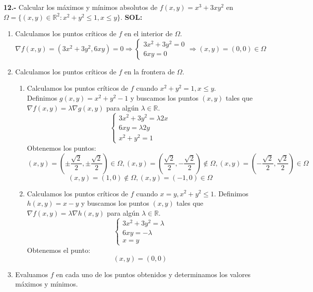 \documentclass[10pt,a4paper]{article}
\begin{document}
\textbf{12.-} Calcular los máximos y mínimos absolutos de $f(x,y)=x^3+3xy^2$ en $\Omega=\{(x,y)\in \mathbb R^2:x^2+y^2\leq 1, x\leq y\}$.
\textbf{SOL:}\\
\begin{enumerate}[1.]
\item Calculamos los puntos críticos de $f$ en el interior de $\Omega$.
$$\nabla f(x,y)=(3x^2+3y^2, 6xy)=0 \Rightarrow \begin{cases} 3x^2+3y^2=0\\6xy=0\end{cases}\Rightarrow (x,y)=(0,0)\in \Omega$$
\item Calculamos los puntos críticos de $f$ en la frontera de $\Omega$.\\
\begin{enumerate}[2.1.]
\item Calculamos los puntos críticos de $f$ cuando $x^2+y^2=1, x\leq y$.\\
Definimos $g(x,y)=x^2+y^2-1$ y buscamos los puntos $(x,y)$ tales que $\nabla f(x,y)=\lambda \nabla g(x,y)$ para algún $\lambda \in \mathbb R$.
$$\begin{cases}
3x^2+3y^2=\lambda 2x\\ 6xy=\lambda 2y\\ x^2+y^2=1
\end{cases}$$
Obtenemos los puntos:
$$(x,y)=\left(\pm\dfrac{\sqrt{2}}{2},\pm\dfrac{\sqrt{2}}{2}\right)\in \Omega,
(x,y)=\left(\dfrac{\sqrt{2}}{2},-\dfrac{\sqrt{2}}{2}\right)\not\in \Omega,
(x,y)=\left(-\dfrac{\sqrt{2}}{2},\dfrac{\sqrt{2}}{2}\right)\in \Omega$$
$$(x,y)=(1,0)\not\in\Omega, (x,y)=(-1,0)\in\Omega$$
\item Calculamos los puntos críticos de $f$ cuando $x=y, x^2+y^2\leq 1$.
Definimos $h(x,y)=x-y$ y buscamos los puntos $(x,y)$ tales que $\nabla f(x,y)=\lambda \nabla h(x,y)$ para algún $\lambda \in \mathbb R$.
$$\begin{cases}
3x^2+3y^2=\lambda\\ 6xy=-\lambda\\ x=y
\end{cases}$$
Obtenemos el punto:
$$(x,y)=(0,0)$$
\end{enumerate}
\item Evaluamos $f$ en cada uno de los puntos obtenidos y determinamos los valores máximos y mínimos.
\end{enumerate}
\end{document}
